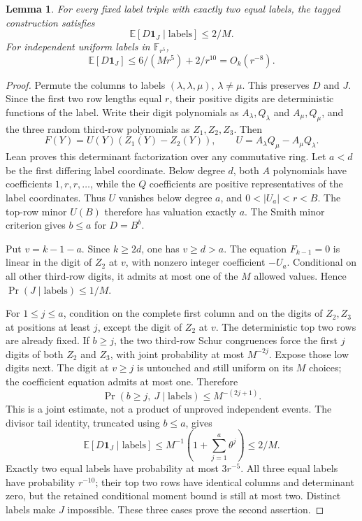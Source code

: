 \documentclass[11pt]{article}
\newtheorem{lemma}{Lemma}
\begin{document}
\begin{lemma}\label{lem:five-collision}
For every fixed label triple with exactly two equal labels, the tagged
construction satisfies
\[
 \mathbb E[D\mathbf1_J\mid\text{labels}]\le2/M.
\]
For independent uniform labels in $\mathbb F_{r^5}$,
\[
 \mathbb E[D\mathbf1_J]\le6/(Mr^5)+2/r^{10}=O_k(r^{-8}).
\]
\end{lemma}
\begin{proof}
Permute the columns to labels $(\lambda,\lambda,\mu)$, $\lambda\ne\mu$.
This preserves $D$ and $J$. Since the first two row lengths equal $r$,
their positive digits are deterministic functions of the label.
Write their digit polynomials as $A_\lambda,Q_\lambda$ and
$A_\mu,Q_\mu$, and the three random third-row polynomials as $Z_1,Z_2,Z_3$.
Then
\[
 F(Y)=U(Y)(Z_1(Y)-Z_2(Y)),\qquad
 U=A_\lambda Q_\mu-A_\mu Q_\lambda.
\]
Lean proves this determinant factorization over any commutative ring.
Let $a<d$ be the first differing label coordinate. Below degree $d$,
both $A$ polynomials have coefficients $1,r,r,\ldots$, while the $Q$
coefficients are positive representatives of the label coordinates.
Thus $U$ vanishes below degree $a$, and $0<|U_a|<r<B$.
The top-row minor $U(B)$ therefore has valuation exactly $a$.
The Smith minor criterion gives $b\le a$ for $D=B^b$.

Put $v=k-1-a$. Since $k\ge2d$, one has $v\ge d>a$.
The equation $F_{k-1}=0$ is linear in the digit of $Z_2$ at $v$,
with nonzero integer coefficient $-U_a$. Conditional on all other
third-row digits, it admits at most one of the $M$ allowed values.
Hence $\Pr(J\mid\text{labels})\le1/M$.

For $1\le j\le a$, condition on the complete first column and on the
digits of $Z_2,Z_3$ at positions at least $j$, except the digit of
$Z_2$ at $v$. The deterministic top two rows are already fixed.
If $b\ge j$, the two third-row Schur congruences force the first $j$
digits of both $Z_2$ and $Z_3$, with joint probability at most $M^{-2j}$.
Expose those low digits next. The digit at $v\ge j$ is untouched and
still uniform on its $M$ choices; the coefficient equation admits at
most one. Therefore
\[
 \Pr(b\ge j,\ J\mid\text{labels})\le M^{-(2j+1)}.
\]
This is a joint estimate, not a product of unproved independent events.
The divisor tail identity, truncated using $b\le a$, gives
\[
 \mathbb E[D\mathbf1_J\mid\text{labels}]
 \le M^{-1}\left(1+\sum_{j=1}^a\theta^j\right)\le2/M.
\]
Exactly two equal labels have probability at most $3r^{-5}$.
All three equal labels have probability $r^{-10}$; their top two rows
have identical columns and determinant zero, but the retained conditional
moment bound is still at most two. Distinct labels make $J$ impossible.
These three cases prove the second assertion.
\end{proof}
\end{document}
